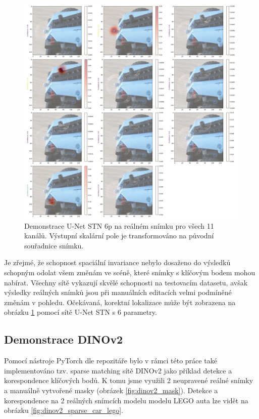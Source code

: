 \begin{figure}[ht]
\centering
\includegraphics[width=1.0\textwidth,keepaspectratio]{Figures/real/real_3.png}
\caption[Demonstrace U-Net STN 6p na reálném snímku]{Demonstrace U-Net STN 6p na reálném snímku pro všech 11 kanálů. Výstupní skalární pole je transformováno na původní souřadnice snímku.}
\label{fig:real_0}
\end{figure}

Je zřejmé, že schopnost spaciální invariance nebylo dosaženo do výsledků schopným odolat všem změnám ve scéně, které snímky s klíčovým bodem mohou nabírat. Všechny sítě vykazují skvělé schopnosti na testovacím datasetu, avšak výsledky reálných snímků jsou při manuálních editacích velmi podmíněné změnám v pohledu. Očekávaná, korektní lokalizace může být zobrazena na obrázku \ref{fig:real_0} pomocí sítě U-Net STN s 6 parametry.

\subsection{Demonstrace DINOv2}

Pomocí nástroje PyTorch dle repozitáře \cite{jupyter_sparse_matching} bylo v rámci této práce také implementováno tzv. sparse matching sítě DINOv2 jako příklad detekce a korespondence klíčových bodů. K tomu jsme využili 2 neupravené reálné snímky a manuálně vytvořené masky (obrázek \ref{fig:dinov2_mask}). Detekce a korespondence na 2 reálných snímcích modelu modelu LEGO auta lze vidět na obrázku \ref{fig:dinov2_sparse_car_lego}.

